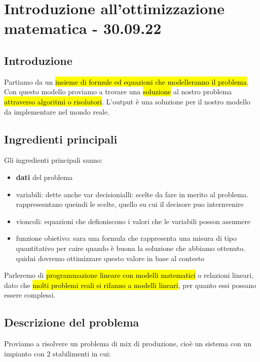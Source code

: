 \section{Introduzione all'ottimizzazione matematica - 30.09.22}

\subsection{Introduzione}

Partiamo da un \hl{insieme di formule ed equazioni che modelleranno il problema}. Con questo modello proviamo a trovare una \hl{soluzione} al nostro problema \hl{attraverso algoritmi o risolutori}. L'output è una soluzione per il nostro modello da implementare nel mondo reale.


\subsection{Ingredienti principali}

Gli ingredienti principali sanno:

\begin{itemize}
	\item \textbf{dati} del problema
	\item variabili: dette anche var decisionialli: scelte da fare in merito al problema. rappresesntano queindi le scelte, quello su cui il decisore puo internvenire
	\item vioncoli: equazioni che defioniscono i valori che le variabili posson assumere
	\item funzione obietivo: sara una formula che rappresenta una misura di tipo quantitativo per caire quando è buona la soluzione che abbiamo ottenuto. quidni dovremo ottimizzare questo valore in base al contesto
\end{itemize}


Parleremo di \hl{programmazione lineare con modelli matematici} o relazioni lineari, dato che \hl{molti problemi reali si rifanno a modelli lineari}, per quanto essi possano essere complessi.


\subsection{Descrizione del problema}

Proviamo a risolvere un problema di mix di produzione, cioè un sistema con un impianto con 2 stabilimenti in cui:

